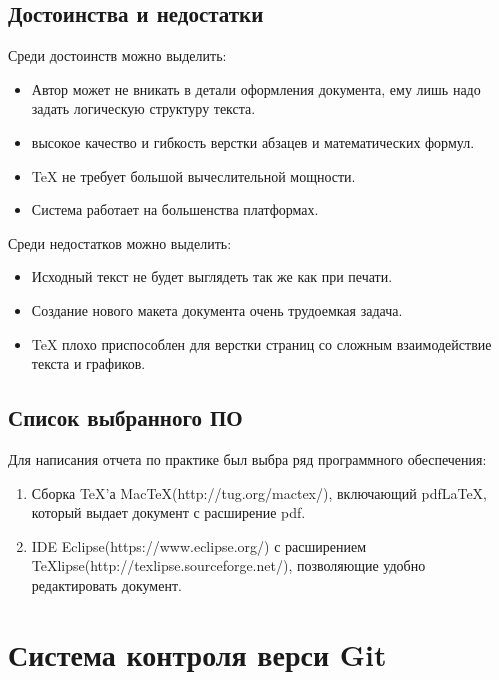 \documentclass[14pt,a4paper]{article}
\begin{document}
\subsection{Достоинства и недостатки \cite{Lvovskii}\cite{web:NeOchen}}
Среди достоинств можно выделить:
\begin{itemize}
\item{}Автор может не вникать в детали оформления документа, ему лишь надо
задать логическую структуру текста.
\item{}высокое качество и гибкость верстки абзацев и математических формул.
\item{}\TeX{} не требует большой вычеслительной мощности.
\item{}Система работает на большенства платформах.
\end{itemize}
Среди недостатков можно выделить:
\begin{itemize}
\item{}Исходный текст не будет выглядеть так же как при печати.
\item{}Создание нового макета документа очень трудоемкая задача.
\item{}\TeX{} плохо приспособлен для верстки страниц со сложным взаимодействие текста
и графиков.
\end{itemize}

\subsection{Список выбранного ПО}
Для написания отчета по практике был выбра ряд программного обеспечения:
\begin{enumerate}
\item Сборка \TeX'а MacTeX(http://tug.org/mactex/), включающий pdfLaTeX, который
выдает документ с расширение pdf.
\item IDE Eclipse(https://www.eclipse.org/) с расширением
TeXlipse(http://texlipse.sourceforge.net/), позволяющие удобно редактировать
документ.
\end{enumerate}
\newpage
\section{Система контроля верси Git}
\end{document}
